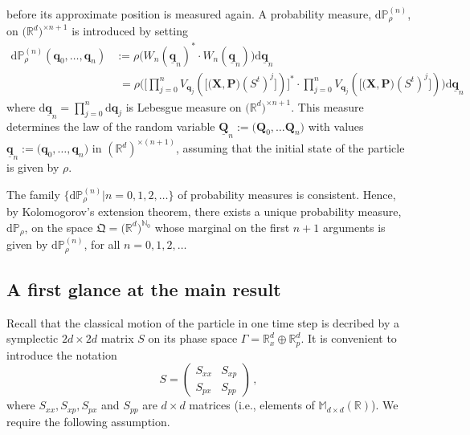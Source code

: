 \documentclass[12pt]{article}
\renewcommand{\d}{{\mathrm d}}
\begin{document}
before its approximate position is measured again.
A probability measure, $\d\mathbb{P}_{\rho}^{(n)}$, on $\big(\mathbb{R}^{d}\big)^{\times{n+1}}$ is introduced by setting
\begin{align}\label{prob}
\d \mathbb{P}^{(n)}_{\rho}(\mathbf{q}_0,\dots, \mathbf{q}_n)&:= \rho\big( W_{n}(\underline{\mathbf{q}}_n)^{*}\cdot 
W_{n}(\underline{\mathbf{q}}_n)\big) \d\underline{\mathbf{q}}_{n}\nonumber\\
&\,\,= \rho\Big(\big[ \prod_{j=0}^{n} V_{\mathbf{q}_j}(\big[\big(\mathbf{X}, \mathbf{P}\big) (S^{t})^{j} \big])\big]^{*}\cdot  \prod_{j=0}^{n} V_{\mathbf{q}_j}(\big[\big(\mathbf{X}, \mathbf{P}\big) (S^{t})^{j} \big])  \Big)\d\underline{\mathbf{q}}_n
\end{align}
where $\d\underline{\mathbf{q}}_{n} =\prod_{j=0}^{n} \d\mathbf{q}_{j}$ is Lebesgue measure on $\big(\mathbb{R}^{d}\big)^{\times{n+1}}$.
This measure determines the law of the random variable $\underline{\mathbf{Q}}_{n}:=\big(\mathbf{Q}_0,\dots \mathbf{Q}_{n}\big)$ with values $\underline{\mathbf{q}}_{n}:= \big(\mathbf{q}_0, \dots, \mathbf{q}_n\big)$ in 
$(\mathbb{R}^{d})^{\times (n+1)}$, assuming that the initial state of the particle is given by $\rho$.

The family  $\big\{\d\mathbb{P}_{\rho}^{(n)}\vert n=0,1,2,\dots\big\}$ of probability measures is consistent. Hence, by Kolomogorov's extension theorem,  there exists a unique probability measure, $\d\mathbb{P}_{\rho}$, on the space $\mathfrak{Q}=\big(\mathbb{R}^{d}\big)^{\mathbb{N}_0}$ whose marginal on the first $n+1$ arguments is given by $\d\mathbb{P}_{\rho}^{(n)}$, for all $n=0,1,2,\dots$

\subsection{A first glance at the main result}\label{main-result}
Recall that the classical motion of the particle in one time step is decribed by a symplectic $2d\times 2d$ matrix $S$ on its phase space $\Gamma= \mathbb{R}^{d}_{x}\oplus \mathbb{R}^{d}_{p}$. It is convenient to introduce the notation 
\begin{equation}\label{ABCD}
S= \begin{pmatrix} S_{xx} & S_{xp}\\
                              S_{px} & S_{pp} \end{pmatrix}\,,
\end{equation}                              
where $S_{xx}, S_{xp}, S_{px}$ and $S_{pp}$ are $d\times d$ matrices (i.e., elements of 
$\mathbb{M}_{d\times d}(\mathbb{R})$).  
We require the following assumption.
\end{document}
